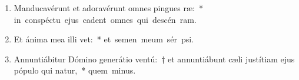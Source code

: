 \begin{flushleft}
\begin{enumerate}[leftmargin=*]
\item Manducavérunt et adoravérunt omnes pingues ræ:~* \mbox{in conspéctu ejus cadent omnes qui descén  ram.}
\item Et ánima mea illi vet:~* \mbox{et semen meum sér psi.}
\item Annuntiábitur Dómino generátio ventú:~† et annuntiábunt cæli justítiam ejus pópulo qui natur,~* \mbox{quem  minus.}

\end{enumerate}
\end{flushleft}

